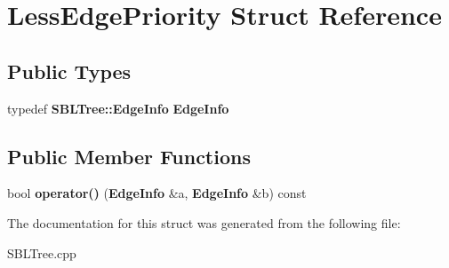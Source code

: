 \section{Less\+Edge\+Priority Struct Reference}
\label{structLessEdgePriority}
\subsection*{Public Types}
\begin{DoxyCompactItemize}
\item 
typedef {\bf S\+B\+L\+Tree\+::\+Edge\+Info} {\bfseries Edge\+Info}\label{structLessEdgePriority_ab1f48c8d7d68ff3fb1f30e4d0c81651c}

\end{DoxyCompactItemize}
\subsection*{Public Member Functions}
\begin{DoxyCompactItemize}
\item 
bool {\bfseries operator()} ({\bf Edge\+Info} \&a, {\bf Edge\+Info} \&b) const \label{structLessEdgePriority_a1cd19fa34c7a01617aef611a2290e09f}

\end{DoxyCompactItemize}


The documentation for this struct was generated from the following file\+:\begin{DoxyCompactItemize}
\item 
S\+B\+L\+Tree.\+cpp\end{DoxyCompactItemize}
